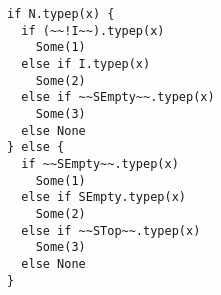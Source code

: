 \begin{lstlisting}[style=scalaioScala]
if N.typep(x) {
  if (~~!I~~).typep(x)
    Some(1)
  else if I.typep(x)
    Some(2)
  else if ~~SEmpty~~.typep(x)
    Some(3)
  else None
} else {
  if ~~SEmpty~~.typep(x)
    Some(1)
  else if SEmpty.typep(x)
    Some(2)
  else if ~~STop~~.typep(x)
    Some(3)
  else None
}
\end{lstlisting}
